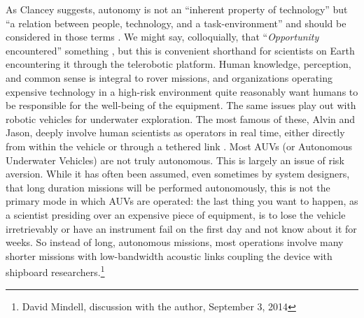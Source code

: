 As Clancey suggests, autonomy is not an ``inherent property of
technology'' but ``a relation between people, technology, and a
task-environment'' and should be considered in those terms \cite[p.
  119]{clancey}. We might say, colloquially, that 
``\emph{Opportunity} encountered'' something \cite[p. 8]{clancey}, but
this is convenient shorthand for scientists on Earth encountering it
through the telerobotic platform. Human knowledge,
perception, and common sense is integral to rover missions, and
organizations operating expensive 
technology in a high-risk environment quite reasonably want humans to
be responsible
for the well-being of the equipment. The same issues play out with
robotic vehicles for underwater exploration. The most famous of these,
Alvin and Jason, deeply involve human scientists as operators in real
time, either directly from within the vehicle or through a tethered
link \cite{NOAA1} \cite{NOAA2}. Most AUVs (or Autonomous Underwater
Vehicles) are not 
truly autonomous. This is largely an issue of risk
aversion. While it has often been assumed, even sometimes by system
designers, that long duration missions will be performed autonomously,
this is not the primary mode in which AUVs are operated: the last
thing you want to happen, as a scientist presiding over an expensive
piece of equipment, is to lose the vehicle irretrievably or have an
instrument fail on the first day and not know about it for weeks. So
instead of long, autonomous missions, most operations involve many
shorter missions with low-bandwidth acoustic links coupling the device with
shipboard researchers.\footnote{David Mindell, discussion with the
  author, September 3, 2014} 






